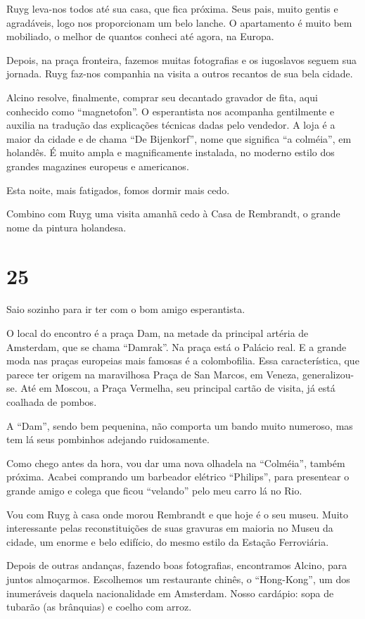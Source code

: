 Ruyg leva-nos todos até sua casa, que fica próxima. Seus pais, muito gentis e agradáveis, logo nos proporcionam um belo lanche. O apartamento é muito bem mobiliado, o melhor de quantos conheci até agora, na Europa.

Depois, na praça fronteira, fazemos muitas fotografias e os iugoslavos seguem sua jornada. Ruyg faz-nos companhia na visita a outros recantos de sua bela cidade.

Alcino resolve, finalmente, comprar seu decantado gravador de fita, aqui conhecido como ``magnetofon''. O esperantista nos acompanha gentilmente e auxilia na tradução das explicações técnicas dadas pelo vendedor. A loja é a maior da cidade e de chama ``De Bijenkorf'', nome que significa ``a colméia'', em holandês. É muito ampla e magnificamente instalada, no moderno estilo dos grandes magazines europeus e americanos.

Esta noite, mais fatigados, fomos dormir mais cedo.

Combino com Ruyg uma visita amanhã cedo à Casa de Rembrandt, o grande nome da pintura holandesa.

\section*{25 \adfflatleafright {}}
Saio sozinho para ir ter com o bom amigo esperantista.

O local do encontro é a praça Dam, na metade da principal artéria de Amsterdam, que se chama ``Damrak''. Na praça está o Palácio real. E a grande moda nas praças europeias mais famosas é a colombofilia. Essa característica, que parece ter origem na maravilhosa Praça de San Marcos, em Veneza, generalizou-se. Até em Moscou, a Praça Vermelha, seu principal cartão de visita, já está coalhada de pombos.

A ``Dam'', sendo bem pequenina, não comporta um bando muito numeroso, mas tem lá seus pombinhos adejando ruidosamente.

Como chego antes da hora, vou dar uma nova olhadela na ``Colméia'', também próxima. Acabei comprando um barbeador elétrico ``Philips'', para presentear o grande amigo e colega que ficou ``velando'' pelo meu carro lá no Rio.

Vou com Ruyg à casa onde morou Rembrandt e que hoje é o seu museu. Muito interessante pelas reconstituições de suas gravuras em maioria no Museu da cidade, um enorme e belo edifício, do mesmo estilo da Estação Ferroviária.

Depois de outras andanças, fazendo boas fotografias, encontramos Alcino, para juntos almoçarmos. Escolhemos um restaurante chinês, o ``Hong-Kong'', um dos inumeráveis daquela nacionalidade em Amsterdam. Nosso cardápio: sopa de tubarão (as brânquias) e coelho com arroz.

